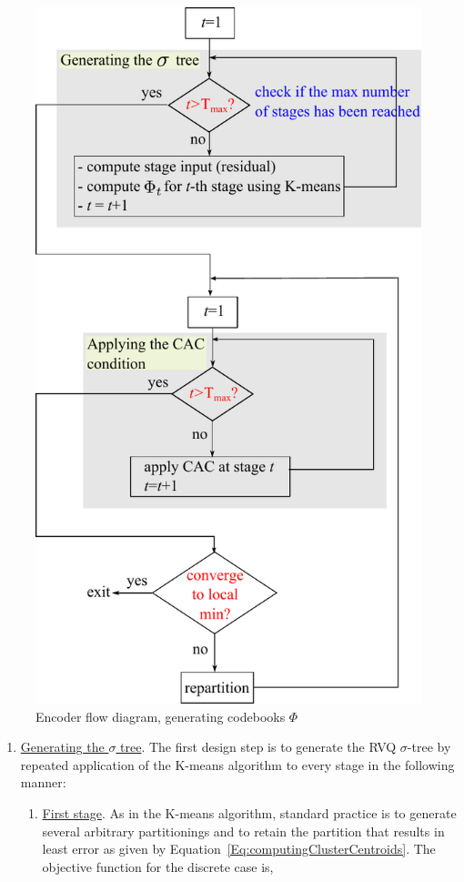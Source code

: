 \begin{Body}
\begin{figure}[ht]
\centering
\includegraphics[height=0.6\textheight]{thesis/RVQ_encoder_flowDiagram.pdf}
\caption{Encoder flow diagram, generating codebooks $\Phi$}
\label{fig:RVQ_encoder_flowDiagram}
\end{figure}


\begin{enumerate}
\item \underline{Generating the $\sigma$ tree}.  The first design step is to generate the RVQ $\sigma$-tree by repeated application of the K-means algorithm to every stage in the following manner:  
\begin{enumerate}
\item \underline{First stage}. As in the K-means algorithm, standard practice is to generate several arbitrary partitionings and to retain the partition that results in least error as given by Equation~\ref{Eq:computingClusterCentroids}.  The objective function for the discrete case is,


\end{enumerate}
\end{enumerate}
\end{Body}
